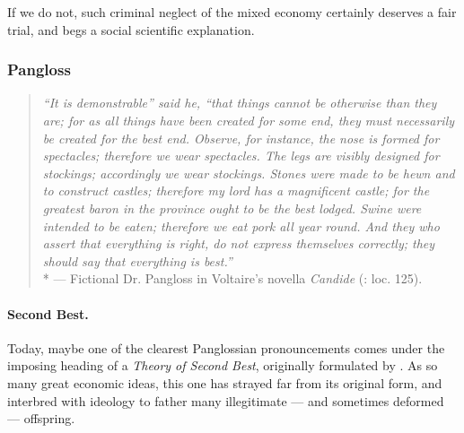 \documentclass[11pt,a4paper,oneside,openright]{article}
\begin{document}
If we do not, such criminal neglect of the mixed economy certainly deserves a fair trial, and begs a social scientific explanation.


\subsubsection{Pangloss} \label{sec:Pangloss}

\begin{quote}
	\emph{``It is demonstrable'' said he, ``that things cannot be otherwise than they are; for as all things have been created for some end, they must necessarily be created for the best end. Observe, for instance, the nose is formed for spectacles; therefore we wear spectacles. The legs are visibly designed for stockings; accordingly we wear stockings. Stones were made to be hewn and to construct castles; therefore my lord has a magnificent castle; for the greatest baron in the province ought to be the best lodged. Swine were intended to be eaten; therefore we eat pork all year round. And they who assert that everything is right, do not express themselves correctly; they should say that everything is best.''}\\*
	--- Fictional Dr. Pangloss in Voltaire's novella \emph{Candide} (\citeyear{Voltaire1759}: loc. 125).
\end{quote}

\paragraph{Second Best.} Today, maybe one of the clearest Panglossian pronouncements comes under the imposing heading of a \emph{Theory of Second Best}, originally formulated by \cite{Lancaster1956}. As so many great economic ideas, this one has strayed far from its original form, and interbred with ideology to father many illegitimate --- and sometimes  deformed --- offspring. 
\end{document}
